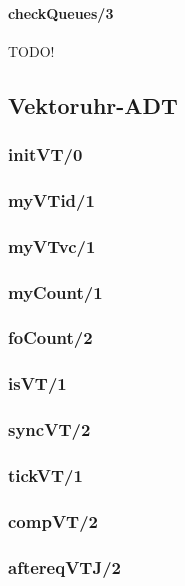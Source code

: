 \paragraph{checkQueues/3}

TODO!

\subsection{Vektoruhr-ADT}

\subsubsection{initVT/0}

\subsubsection{myVTid/1}

\subsubsection{myVTvc/1}

\subsubsection{myCount/1}

\subsubsection{foCount/2}

\subsubsection{isVT/1}

\subsubsection{syncVT/2}

\subsubsection{tickVT/1}

\subsubsection{compVT/2}

\subsubsection{aftereqVTJ/2}

